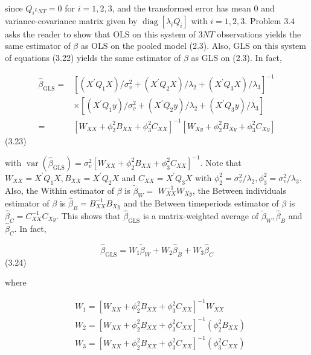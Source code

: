 \documentclass[
]{book}
\begin{document}
since \(Q_{i} \iota_{N T}=0\) for \(i=1,2,3\), and the transformed error has mean 0 and variance-covariance matrix given by \(\operatorname{diag}\left[\lambda_{i} Q_{i}\right]\) with \(i=1,2,3 .\) Problem \(3.4\) asks the reader to show that \(\mathrm{OLS}\) on this system of \(3 N T\) observations yields the same estimator of \(\beta\) as OLS on the pooled model (2.3). Also, GLS on this system of equations (3.22) yields the same estimator of \(\beta\) as GLS on (2.3). In fact,

\begin{equation}
\begin{aligned}
\widehat{\beta}_{\mathrm{GLS}}=&\left[\left(X^{\prime} Q_{1} X\right) / \sigma_{v}^{2}+\left(X^{\prime} Q_{2} X\right) / \lambda_{2}+\left(X^{\prime} Q_{3} X\right) / \lambda_{3}\right]^{-1} \\
& \times\left[\left(X^{\prime} Q_{1} y\right) / \sigma_{v}^{2}+\left(X^{\prime} Q_{2} y\right) / \lambda_{2}+\left(X^{\prime} Q_{3} y\right) / \lambda_{3}\right] \\
=&\left[W_{X X}+\phi_{2}^{2} B_{X X}+\phi_{3}^{2} C_{X X}\right]^{-1}\left[W_{X y}+\phi_{2}^{2} B_{X y}+\phi_{3}^{2} C_{X y}\right]
\end{aligned}
\end{equation} (3.23)

with \(\operatorname{var}\left(\widehat{\beta}_{\mathrm{GLS}}\right)=\sigma_{v}^{2}\left[W_{X X}+\phi_{2}^{2} B_{X X}+\phi_{3}^{2} C_{X X}\right]^{-1}\). Note that \(W_{X X}=X^{\prime} Q_{1} X, B_{X X}=X^{\prime} Q_{2} X\)
and \(C_{X X}=X^{\prime} Q_{3} X\) with \(\phi_{2}^{2}=\sigma_{v}^{2} / \lambda_{2}, \phi_{3}^{2}=\sigma_{v}^{2} / \lambda_{3} .\) Also, the Within estimator of \(\beta\) is \(\widetilde{\beta}_{W}=\)
\(W_{X X}^{-1} W_{X y}\), the Between individuals estimator of \(\beta\) is \(\widehat{\beta}_{B}=B_{X X}^{-1} B_{X y}\) and the Between timeperiods estimator of \(\beta\) is \(\widehat{\beta}_{C}=C_{X X}^{-1} C_{X y}\). This shows that \(\widehat{\beta}_{\mathrm{GLS}}\) is a matrix-weighted average of \(\widetilde{\beta}_{W}, \widehat{\beta}_{B}\) and \(\widehat{\beta}_{C}\). In fact,

\begin{equation}
\widehat{\beta}_{\mathrm{GLS}}=W_{1} \widetilde{\beta}_{W}+W_{2} \widehat{\beta}_{B}+W_{3} \widehat{\beta}_{C}
\end{equation} (3.24)

where

\begin{equation}
\begin{aligned}
&W_{1}=\left[W_{X X}+\phi_{2}^{2} B_{X X}+\phi_{3}^{2} C_{X X}\right]^{-1} W_{X X} \\
&W_{2}=\left[W_{X X}+\phi_{2}^{2} B_{X X}+\phi_{3}^{2} C_{X X}\right]^{-1}\left(\phi_{2}^{2} B_{X X}\right) \\
&W_{3}=\left[W_{X X}+\phi_{2}^{2} B_{X X}+\phi_{3}^{2} C_{X X}\right]^{-1}\left(\phi_{3}^{2} C_{X X}\right)
\end{aligned}
\end{equation}
\end{document}
